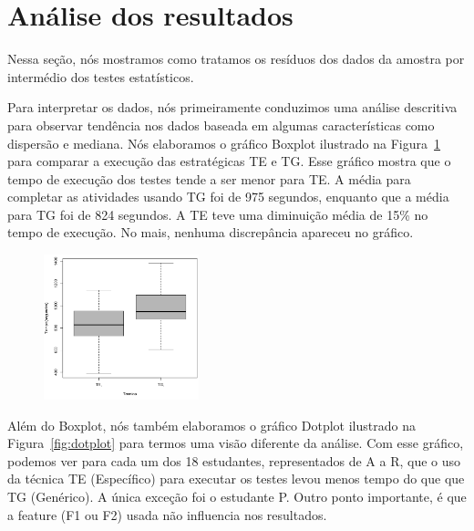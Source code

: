 \section{An\'alise dos resultados}
\label{sec:resultados}


Nessa seção, nós mostramos como tratamos os resíduos dos dados da amostra por intermédio dos testes estatísticos. 

Para interpretar os dados, nós primeiramente conduzimos uma análise descritiva para observar tendência nos dados baseada em algumas características como dispersão e mediana. Nós elaboramos o gráfico Boxplot ilustrado na Figura~\ref{fig:boxplot} para comparar a execução das estratégicas TE e TG. Esse gráfico mostra que o tempo de execução dos testes tende a ser menor para TE. A média para completar as atividades usando TG foi de 975 segundos, enquanto que a média para TG foi de 824 segundos. A TE teve uma diminuição média de 15\% no tempo de execução. No mais, nenhuma discrepância apareceu no gráfico.

\begin{figure}[t]
    \centering
    \includegraphics[width=0.4\textwidth]{images/boxplot.png}
    \caption{}
    \label{fig:boxplot}
\end{figure}

Além do Boxplot, nós também elaboramos o gráfico Dotplot ilustrado na Figura~\ref{fig:dotplot} para termos uma visão diferente da análise. Com esse gráfico, podemos ver para cada um dos 18 estudantes, representados de A a R, que o uso da técnica TE (Específico) para executar os testes levou menos tempo do que que TG (Genérico). A única exceção foi o estudante P. Outro ponto importante, é que a feature (F1 ou F2) usada não influencia nos resultados.


